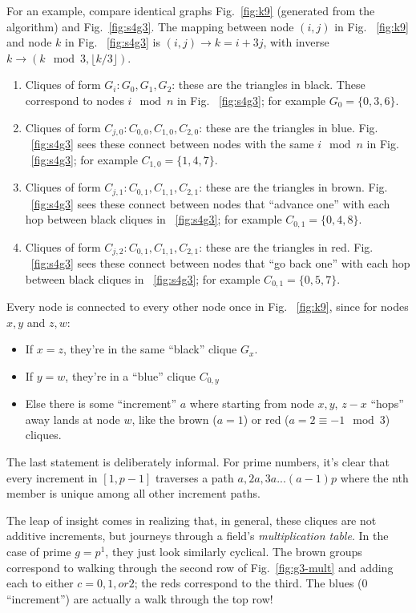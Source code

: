 \documentclass[11pt, oneside]{article} 	%
\begin{document}
For an example, compare identical graphs Fig.~\ref{fig:k9} (generated from the algorithm) and Fig.~\ref{fig:s4g3}. The mapping between node $(i,j)$ in Fig. ~\ref{fig:k9} and node $k$ in Fig. ~\ref{fig:s4g3} is $(i,j) \rightarrow k=i+3j$, with inverse $k \rightarrow (k \mod 3, \lfloor k / 3 \rfloor)$.

\begin{enumerate}
\item Cliques of form $G_i: G_0, G_1, G_2$: these are the triangles in black. These correspond to nodes $i \mod n$ in Fig. ~\ref{fig:s4g3}; for example $G_0 = \{0, 3, 6\}$.
\item Cliques of form $C_{j, 0}: C_{0,0}, C_{1, 0}, C_{2,0}$: these are the triangles in blue. Fig. ~\ref{fig:s4g3} sees these connect between nodes with the same $i \mod n$ in Fig. ~\ref{fig:s4g3}; for example $C_{1,0} = \{1, 4, 7\}$.
\item Cliques of form $C_{j, 1}: C_{0,1}, C_{1, 1}, C_{2,1}$: these are the triangles in brown. Fig. ~\ref{fig:s4g3} sees these connect between nodes that ``advance one'' with each hop between black cliques in ~\ref{fig:s4g3}; for example $C_{0,1} = \{0, 4, 8\}$.
\item Cliques of form $C_{j, 2}: C_{0,1}, C_{1, 1}, C_{2,1}$: these are the triangles in red. Fig. ~\ref{fig:s4g3} sees these connect between nodes that ``go back one'' with each hop between black cliques in ~\ref{fig:s4g3}; for example $C_{0,1} = \{0, 5, 7\}$.
\end{enumerate}


Every node is connected to every other node once in Fig. ~\ref{fig:k9}, since for nodes $x,y$ and $z,w$:
\begin{itemize}
\item If $x = z$, they're in the same ``black'' clique $G_x$.
\item If $y=w$, they're in a ``blue'' clique $C_{0,y}$
\item Else there is some ``increment'' $a$ where starting from node $x,y$, $z-x$ ``hops'' away lands at node $w$, like the brown ($a=1$) or red ($a=2\equiv -1 \mod 3 $) cliques.
\end{itemize}


The last statement is deliberately informal. For prime numbers, it's clear that every increment in $[1, p-1]$ traverses a path $a, 2a, 3a ... (a-1)p$ where the nth member is unique among all other increment paths.

The leap of insight comes in realizing that, in general, these cliques are not additive increments, but journeys through a field's \emph{multiplication table}. In the case of prime $g=p^1$, they just look similarly cyclical. The brown groups correspond to walking through the second row of Fig.~\ref{fig:g3-mult} and adding each to either $c=0, 1, or 2$; the reds correspond to the third. The blues (0 ``increment'') are actually a walk through the top row!
\end{document}
